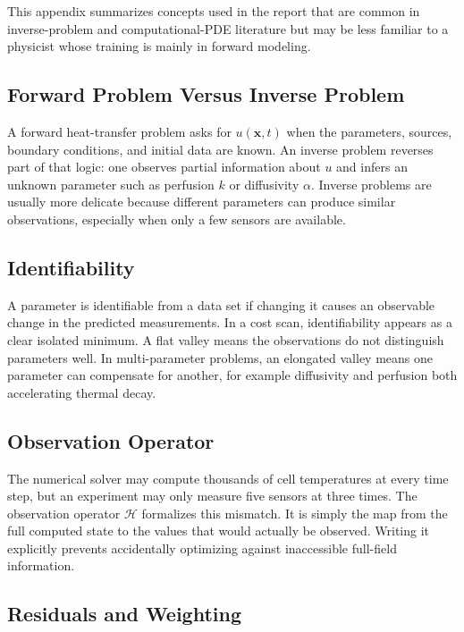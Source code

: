 \documentclass[11pt]{article}
\numberwithin{equation}{section}
\begin{document}
This appendix summarizes concepts used in the report that are common in
inverse-problem and computational-PDE literature but may be less familiar to a
physicist whose training is mainly in forward modeling.

\subsection{Forward Problem Versus Inverse Problem}

A forward heat-transfer problem asks for $u(\bm{x},t)$ when the parameters,
sources, boundary conditions, and initial data are known.  An inverse problem
reverses part of that logic: one observes partial information about $u$ and
infers an unknown parameter such as perfusion $k$ or diffusivity $\alpha$.
Inverse problems are usually more delicate because different parameters can
produce similar observations, especially when only a few sensors are available.

\subsection{Identifiability}

A parameter is identifiable from a data set if changing it causes an observable
change in the predicted measurements.  In a cost scan, identifiability appears
as a clear isolated minimum.  A flat valley means the observations do not
distinguish parameters well.  In multi-parameter problems, an elongated valley
means one parameter can compensate for another, for example diffusivity and
perfusion both accelerating thermal decay.

\subsection{Observation Operator}

The numerical solver may compute thousands of cell temperatures at every time
step, but an experiment may only measure five sensors at three times.  The
observation operator $\mathcal{H}$ formalizes this mismatch.  It is simply the
map from the full computed state to the values that would actually be observed.
Writing it explicitly prevents accidentally optimizing against inaccessible
full-field information.

\subsection{Residuals and Weighting}
\end{document}
